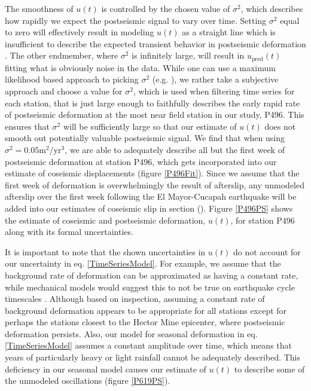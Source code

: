 \documentclass[12pt]{article}
\begin{document}
The smoothness of $u(t)$ is controlled by the chosen value of $\sigma^2$, which describes how rapidly we expect the postseismic signal to vary over time.  Setting $\sigma^2$ equal to zero will effectively result in modeling $u(t)$ as a straight line which is insufficient to describe the expected transient behavior in postseismic deformation \cite{Savage2005a}. The other endmember, where $\sigma^2$ is infinitely large, will result in $u_\mathrm{pred}(t)$ fitting what is obviously noise in the data. While one can use a maximum likelihood based approach to picking $\sigma^2$ (e.g. \cite{Segall1997}), we rather take a subjective approach and choose a value for $\sigma^2$, which is used when filtering time series for each station, that is just large enough to faithfully describes the early rapid rate of postseismic deformation at the most near field station in our study, P496.  This ensures that $\sigma^2$ will be sufficiently large so that our estimate of $u(t)$ does not smooth out potentially valuable postseismic signal. We find that when using $\sigma^2 = 0.05 \mathrm{m}^2 / \mathrm{yr}^3$, we are able to adequately describe all but the first week of postseismic deformation at station P496, which gets incorporated into our estimate of coseismic displacements (figure \ref{P496Fit}).  Since we assume that the first week of deformation is overwhelmingly the result of afterslip, any unmodeled afterslip over the first week following the El Mayor-Cucapah earthquake will be added into our estimates of coseismic slip in section ().  Figure \ref{P496PS} shows the estimate of coseismic and postseismic deformation, $u(t)$, for station P496 along with its formal uncertainties. 

It is important to note that the shown uncertainties in $u(t)$ do not account for our uncertainty in eq. \ref{TimeSeriesModel}.  For example, we assume that the background rate of deformation can be approximated as having a constant rate, while mechanical models would suggest this to not be true on earthquake cycle timescales \cite{Thatcher1983}. Although based on inspection,  assuming a constant rate of background deformation appears to be appropriate for all stations except for perhaps the stations closest to the Hector Mine epicenter, where postseismic deformation persists.  Also, our model for seasonal deformation in eq. \ref{TimeSeriesModel} assumes a constant amplitude over time, which means that years of particularly heavy or light rainfall cannot be adequately described.  This deficiency in our seasonal model causes our estimate of $u(t)$ to describe some of the unmodeled oscillations (figure \ref{P619PS}).          
\end{document}
